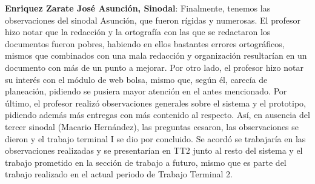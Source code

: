 \newline
\newline
\textbf{Enriquez Zarate José Asunción, Sinodal}: Finalmente, tenemos las observaciones del sinodal Asunción, que fueron rígidas y numerosas. El profesor hizo notar que la redacción y la ortografía con las que se redactaron los documentos fueron pobres, habiendo en ellos bastantes errores ortográficos, mismos que combinados con una mala redacción y organización resultarían en un documento con más de un punto a mejorar. Por otro lado, el profesor hizo notar su interés con el módulo de web bolsa, mismo que, según él, carecía de planeación, pidiendo se pusiera mayor atención en el antes mencionado. Por último, el profesor realizó observaciones generales sobre el sistema y el prototipo, pidiendo además más entregas con más contenido al respecto.
\newline
\newline
Así, en ausencia del tercer sinodal (Macario Hernández), las preguntas cesaron, las observaciones se dieron y el trabajo terminal I se dio por concluido. Se acordó se trabajaría en las observaciones realizadas y se presentarían en TT2 junto al resto del sistema y el trabajo prometido en la sección de trabajo a futuro, mismo que es parte del trabajo realizado en el actual periodo de Trabajo Terminal 2.